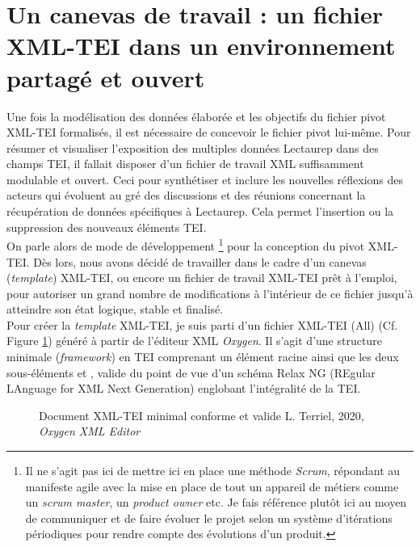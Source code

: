 \section{Un canevas de travail : un fichier XML-TEI dans un environnement partagé et ouvert}
Une fois la modélisation des données élaborée et les objectifs du fichier pivot XML-TEI formalisés, il est nécessaire de concevoir le fichier pivot lui-même. 
Pour résumer et visualiser l'exposition des multiples données Lectaurep dans des champs TEI, il fallait disposer d'un fichier de travail XML suffisamment modulable et ouvert.
Ceci pour synthétiser et inclure les nouvelles réflexions des acteurs qui évoluent au gré des discussions et des réunions concernant la récupération de données spécifiques à Lectaurep. Cela permet l'insertion ou la suppression des nouveaux éléments TEI.\\

On parle alors de mode de développement \footnote{Il ne s'agit pas ici de mettre ici en place une méthode \textit{Scrum}, répondant au manifeste agile avec la mise en place de tout un appareil de métiers comme un \textit{scrum master}, un \textit{product owner} etc. Je fais référence plutôt ici au moyen de communiquer et de faire évoluer le projet selon un système d'itérations périodiques pour rendre compte des évolutions d'un produit.} pour la conception du pivot XML-TEI. Dès lors, nous avons décidé de travailler dans le cadre d'un canevas (\textit{template}) XML-TEI, ou encore un fichier de travail XML-TEI prêt à l'emploi, pour autoriser un grand nombre de modifications à l'intérieur de ce fichier jusqu'à atteindre son état logique, stable et finalisé.\\

Pour créer la \textit{template} XML-TEI, je suis parti d'un fichier XML-TEI (All) (Cf. Figure \ref{fig:document_minimal_tei}) généré à partir de l'éditeur XML \textit{Oxygen}. Il s'agit d'une structure minimale (\textit{framework}) en TEI comprenant un élément racine  ainsi que les deux sous-éléments  et , valide du point de vue d'un schéma Relax NG (REgular LAnguage for XML Next Generation) englobant l'intégralité de la TEI.
   
\begin{figure}[h]
    \centering
    \centerline{}
    \caption{Document XML-TEI minimal conforme et valide  \textcopyright L. Terriel, 2020, \textit{Oxygen XML Editor}}
    \label{fig:document_minimal_tei}
\end{figure}

